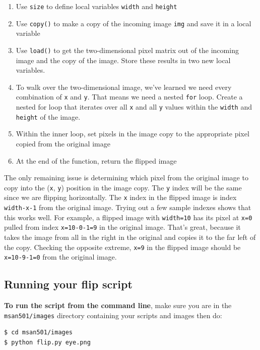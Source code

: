 \documentclass[titlepage]{tufte-book}
\begin{document}
\begin{enumerate}
\item Use {\tt size} to define local variables {\tt width} and {\tt height}
\item Use {\tt copy()} to make a copy of the incoming image {\tt img} and save it in a local variable
\item Use {\tt load()} to get the two-dimensional pixel matrix out of the incoming image and the copy of the image. Store these results in two new local variables.
\item To walk over the two-dimensional image, we've learned we need every combination of {\tt x} and {\tt y}. That means we need a nested {\tt for} loop. Create a nested for loop that iterates over all {\tt x} and all {\tt y} values within the {\tt width} and {\tt height} of the image.
\item Within the inner loop, set pixels in the image copy to the appropriate pixel copied from the original image
\item At the end of the function, return the flipped image
\end{enumerate}

The only remaining issue is determining which pixel from the original image to copy into the ({\tt x}, {\tt y}) position in the image copy. The {\tt y} index will be the same since we are flipping horizontally. The {\tt x} index in the flipped image is index {\tt width-x-1} from the original image. Trying out a few sample indexes shows that this works well. For example, a flipped image with {\tt width=10} has its pixel at {\tt x=0} pulled from index {\tt x=10-0-1=9} in the original image. That's great, because it takes the image from all in the right in the original and copies it to the far left of the copy. Checking the opposite extreme, {\tt x=9} in the flipped image should be {\tt x=10-9-1=0} from the original image.

\subsection{Running your flip script}

{\bf To run the script from the command line}, make sure you are in the {\tt msan501/images} directory containing your scripts and images then do:

\begin{lstlisting}[style=BashInputStyle]
$ cd msan501/images
$ python flip.py eye.png
\end{lstlisting}
\end{document}
